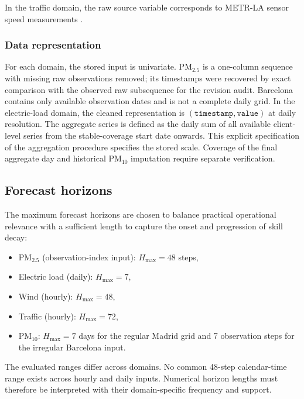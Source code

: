 \documentclass[pdflatex,sn-mathphys]{sn-jnl}
\begin{document}
In the traffic domain, the raw source variable corresponds to METR-LA
sensor speed measurements \citep{li2018dcrnn}.

\subsubsection{Data representation}
For each domain, the stored input is univariate. PM$_{2.5}$ is a one-column
sequence with missing raw observations removed; its timestamps were recovered
by exact comparison with the observed raw subsequence for the revision audit.
Barcelona contains only available observation dates and is not a complete
daily grid. In the electric-load domain, the cleaned
representation is $(\texttt{timestamp}, \texttt{value})$ at daily
resolution. The aggregate series is defined as the daily sum of all
available client-level series from the stable-coverage start date
onwards. This explicit specification of the aggregation procedure
specifies the stored scale. Coverage of the final aggregate day and historical
PM$_{10}$ imputation require separate verification.

\subsection{Forecast horizons}
The maximum forecast horizons are chosen to balance practical
operational relevance with a sufficient length to capture the onset and
progression of skill decay:
\begin{itemize}
  \item PM$_{2.5}$ (observation-index input): $H_{\max}=48$ steps,
  \item Electric load (daily): $H_{\max}=7$,
  \item Wind (hourly): $H_{\max}=48$,
  \item Traffic (hourly): $H_{\max}=72$,
  \item PM$_{10}$: $H_{\max}=7$ days for the regular Madrid grid and
  7 observation steps for the irregular Barcelona input.
\end{itemize}
The evaluated ranges differ across domains. No common 48-step calendar-time
range exists across hourly and daily inputs. Numerical horizon lengths must
therefore be interpreted with their domain-specific frequency and support.
\end{document}
